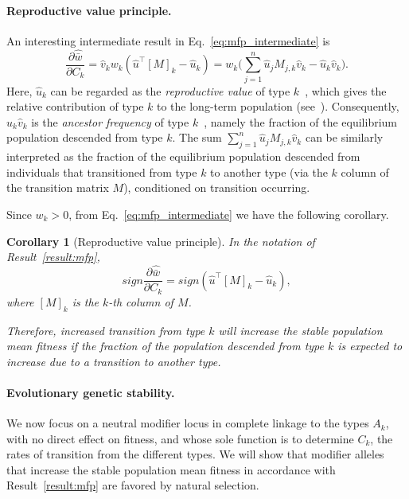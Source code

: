 \documentclass[9pt, a4paper, twocolumn]{extarticle}
\newcommand*{\tr}{^\intercal}
\newtheorem{corollary}{Corollary}
\begin{document}
\paragraph*{Reproductive value principle.}

An interesting intermediate result in Eq.~\ref{eq:mfp_intermediate} is
\begin{equation}
\frac{\partial \hat{\bar w}}{\partial C_k} = 
\hat v_k w_k (\hat u\tr[M]_k - \hat u_k) = 
w_k \Big(\sum_{j=1}^{n}{\hat u_j M_{j,k} \hat v_k} - \hat u_k \hat v_k\Big).
\end{equation}
Here, $\hat u_k$ can be regarded as the \emph{reproductive value} of type $k$~\citep[pg.~27]{Fisher1930}, which gives the relative contribution of type $k$ to the long-term population (see~).
Consequently, $\hat u_k \hat v_k$ is the \emph{ancestor frequency} of type $k$~\citep{Hermisson2002}, namely the fraction of the equilibrium population descended from type $k$.
The sum $\sum_{j=1}^{n}{\hat u_j M_{j,k} \hat v_k}$ can be similarly interpreted as the fraction of the equilibrium population descended from individuals that transitioned from type $k$ to another type (via the $k$ column of the transition matrix $M$), conditioned on transition occurring.

Since $w_k>0$, from Eq.~\ref{eq:mfp_intermediate} we have the following corollary.

\begin{corollary}[Reproductive value principle]
In the notation of Result~\ref{result:mfp},
\begin{equation}
sign \frac{\partial \hat{\bar w}}{\partial C_k} = 
sign (\hat u\tr [M]_k - \hat u_k),
\end{equation}
where $[M]_k$ is the $k$-th column of $M$.

Therefore, increased transition from type $k$ will increase the stable population mean fitness if the fraction of the population descended from type $k$ is expected to increase due to a transition to another type. 
\end{corollary}

\paragraph*{Evolutionary genetic stability.}

We now focus on a neutral modifier locus in complete linkage to the types $A_k$, with no direct effect on fitness, and whose sole function is to determine $C_k$, the rates of transition from the different types.
We will show that modifier alleles that increase the stable population mean fitness in accordance with Result~\ref{result:mfp} are favored by natural selection.
\end{document}
